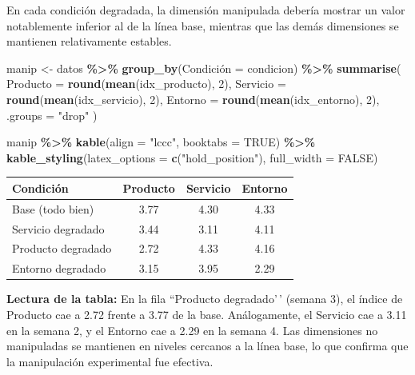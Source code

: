 \documentclass[
  spanish,
]{article}
\newenvironment{Shaded}{\begin{snugshade}}{\end{snugshade}}
\newcommand{\AttributeTok}[1]{\textcolor[rgb]{0.13,0.29,0.53}{#1}}
\newcommand{\ConstantTok}[1]{\textcolor[rgb]{0.56,0.35,0.01}{#1}}
\newcommand{\DecValTok}[1]{\textcolor[rgb]{0.00,0.00,0.81}{#1}}
\newcommand{\FunctionTok}[1]{\textcolor[rgb]{0.13,0.29,0.53}{\textbf{#1}}}
\newcommand{\NormalTok}[1]{#1}
\newcommand{\OtherTok}[1]{\textcolor[rgb]{0.56,0.35,0.01}{#1}}
\newcommand{\SpecialCharTok}[1]{\textcolor[rgb]{0.81,0.36,0.00}{\textbf{#1}}}
\newcommand{\StringTok}[1]{\textcolor[rgb]{0.31,0.60,0.02}{#1}}
\begin{document}
En cada condición degradada, la dimensión manipulada debería mostrar un
valor notablemente inferior al de la línea base, mientras que las demás
dimensiones se mantienen relativamente estables.

\begin{Shaded}
\begin{Highlighting}[]
\NormalTok{manip }\OtherTok{\textless{}{-}}\NormalTok{ datos }\SpecialCharTok{\%\textgreater{}\%}
  \FunctionTok{group\_by}\NormalTok{(}\StringTok{\textasciigrave{}}\AttributeTok{Condición}\StringTok{\textasciigrave{}} \OtherTok{=}\NormalTok{ condicion) }\SpecialCharTok{\%\textgreater{}\%}
  \FunctionTok{summarise}\NormalTok{(}
    \AttributeTok{Producto =} \FunctionTok{round}\NormalTok{(}\FunctionTok{mean}\NormalTok{(idx\_producto), }\DecValTok{2}\NormalTok{),}
    \AttributeTok{Servicio =} \FunctionTok{round}\NormalTok{(}\FunctionTok{mean}\NormalTok{(idx\_servicio), }\DecValTok{2}\NormalTok{),}
    \AttributeTok{Entorno  =} \FunctionTok{round}\NormalTok{(}\FunctionTok{mean}\NormalTok{(idx\_entorno), }\DecValTok{2}\NormalTok{),}
    \AttributeTok{.groups  =} \StringTok{"drop"}
\NormalTok{  )}

\NormalTok{manip }\SpecialCharTok{\%\textgreater{}\%}
  \FunctionTok{kable}\NormalTok{(}\AttributeTok{align    =} \StringTok{"lccc"}\NormalTok{,}
        \AttributeTok{booktabs =} \ConstantTok{TRUE}\NormalTok{) }\SpecialCharTok{\%\textgreater{}\%}
  \FunctionTok{kable\_styling}\NormalTok{(}\AttributeTok{latex\_options =} \FunctionTok{c}\NormalTok{(}\StringTok{"hold\_position"}\NormalTok{),}
                \AttributeTok{full\_width =} \ConstantTok{FALSE}\NormalTok{)}
\end{Highlighting}
\end{Shaded}

\begin{table}[!h]
\centering
\begin{tabular}{lccc}
\toprule
Condición & Producto & Servicio & Entorno\\
\midrule
Base (todo bien) & 3.77 & 4.30 & 4.33\\
Servicio degradado & 3.44 & 3.11 & 4.11\\
Producto degradado & 2.72 & 4.33 & 4.16\\
Entorno degradado & 3.15 & 3.95 & 2.29\\
\bottomrule
\end{tabular}
\end{table}

\textbf{Lectura de la tabla:} En la fila ``Producto degradado'\,'
(semana 3), el índice de Producto cae a 2.72 frente a 3.77 de la base.
Análogamente, el Servicio cae a 3.11 en la semana 2, y el Entorno cae a
2.29 en la semana 4. Las dimensiones no manipuladas se mantienen en
niveles cercanos a la línea base, lo que confirma que la manipulación
experimental fue efectiva.
\end{document}
